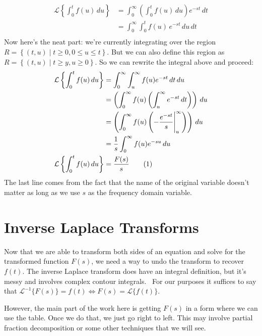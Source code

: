 \documentclass[letterpaper, 11pt, openany]{book}
\theoremstyle{mytheoremstyle}
\theoremstyle{myexamplestyle}
\newcommand\numberthisline{\addtocounter{equation}{1}\tag{\theequation}}
\begin{document}
\begin{align*}
    \mathcal{L}\left\{\int_{0}^{t} f(u)\, du\right\}    &= \int_{0}^{\infty} \left(\int_{0}^{t} f(u)\, du\right)e^{-st}\, dt\\
                                                        &= \int_{0}^{\infty} \int_{0}^{t} f(u)\, e^{-st}\, du\, dt\\
\end{align*}
Now here's the neat part: we're currently integrating over the region \(R=\left\{(t,u)\mid t \geq0, 0 \leq u \leq t\right\}\). But we can also define this region as \(R=\left\{(t,u)\mid t \geq y, u \geq 0\right\}\). So we can rewrite the integral above and proceed:
\begin{align*}
    \mathcal{L}\left\{\int_{0}^{t} f(u)\, du\right\}    &= \int_{0}^{\infty} \int_{u}^{\infty} f(u) e^{-st}\,dt\,du\\
                                                        &= \left(\int_{0}^{\infty}f(u)\left(\int_{u}^{\infty}e^{-st}\,dt\right)\right)\,du\\
                                                        &= \left(\int_{0}^{\infty}f(u)\left(-\frac{e^{-st}}{s}\Bigg|_{u}^{\infty}\right)\right)\,du\\
                                                        &= \frac{1}{s}\int_{0}^{\infty}f(u)e^{-su}\,du\\
    \mathcal{L}\left\{\int_{0}^{t} f(u)\, du\right\}    &= \frac{F(s)}{s} \numberthisline \label{de:Laplace-of-integral}
\end{align*}
The last line comes from the fact that the name of the original variable doesn't matter as long as we use \(s\) as the frequency domain variable.
\section{Inverse Laplace Transforms}
\setcounter{figure}{0}
Now that we are able to transform both sides of an equation and solve for the transformed function \(F(s)\), we need a way to undo the transform to recover \(f(t)\). The inverse Laplace transform does have an integral definition, but it's messy and involves complex contour integrals. \faFrown \ For our purposes it suffices to say that \(\mathcal{L}^{-1}\{F(s)\} = f(t) \Leftrightarrow F(s) = \mathcal{L}\{f(t)\}\).

However, the main part of the work here is getting \(F(s)\) in a form where we can use the table. Once we do that, we just go right to left. This may involve partial fraction decomposition or some other techniques that we will see.
\end{document}
